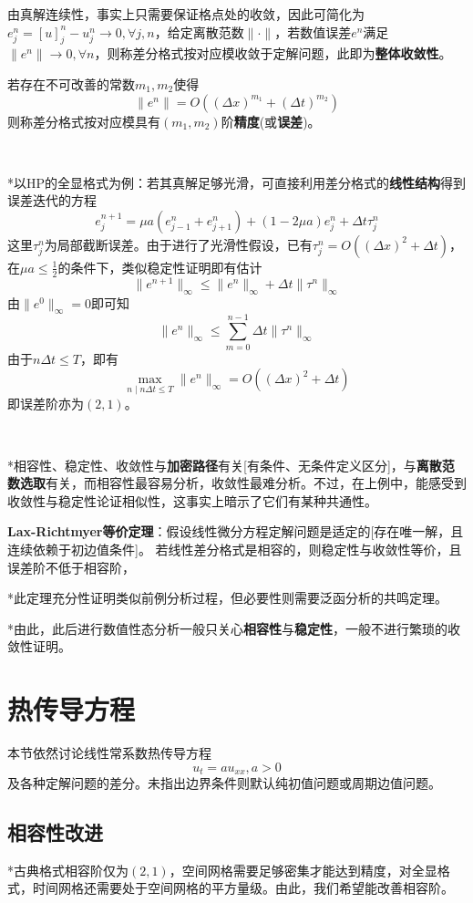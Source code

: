 \documentclass[a4paper,UTF8,fontset=windows]{ctexart}
\begin{document}
由真解连续性，事实上只需要保证格点处的收敛，因此可简化为$e_j^n=[u]_j^n-u_j^n\to0,\forall j,n$，给定离散范数$\|\cdot\|$，若数值误差$e^n$满足$\|e^n\|\to0,\forall n$，则称差分格式按对应模收敛于定解问题，此即为\textbf{整体收敛性}。

若存在不可改善的常数$m_1,m_2$使得
$$\|e^n\|=O((\Delta x)^{m_1}+(\Delta t)^{m_2})$$
则称差分格式按对应模具有$(m_1,m_2)$阶\textbf{精度}(或\textbf{误差})。

\

*以HP的全显格式为例：若其真解足够光滑，可直接利用差分格式的\textbf{线性结构}得到误差迭代的方程
$$e_j^{n+1}=\mu a(e_{j-1}^n+e_{j+1}^n)+(1-2\mu a)e_j^n+\Delta t\tau_j^n$$
这里$\tau_j^n$为局部截断误差。由于进行了光滑性假设，已有$\tau_j^n=O((\Delta x)^2+\Delta t)$，在$\mu a\le\frac{1}{2}$的条件下，类似稳定性证明即有估计
$$\|e^{n+1}\|_\infty\le\|e^n\|_\infty+\Delta t\|\tau^n\|_\infty$$
由$\|e^0\|_\infty=0$即可知
$$\|e^n\|_\infty\le\sum_{m=0}^{n-1}\Delta t\|\tau^n\|_\infty$$
由于$n\Delta t\le T$，即有
$$\max_{n\mid n\Delta t\le T}\|e^n\|_\infty=O((\Delta x)^2+\Delta t)$$
即误差阶亦为$(2,1)$。

\

*相容性、稳定性、收敛性与\textbf{加密路径}有关[有条件、无条件定义区分]，与\textbf{离散范数选取}有关，而相容性最容易分析，收敛性最难分析。不过，在上例中，能感受到收敛性与稳定性论证相似性，这事实上暗示了它们有某种共通性。

\textbf{Lax-Richtmyer等价定理}：假设线性微分方程定解问题是适定的[存在唯一解，且连续依赖于初边值条件]。
若线性差分格式是相容的，则稳定性与收敛性等价，且误差阶不低于相容阶，

*此定理充分性证明类似前例分析过程，但必要性则需要泛函分析的共鸣定理。

*由此，此后进行数值性态分析一般只关心\textbf{相容性}与\textbf{稳定性}，一般不进行繁琐的收敛性证明。

\section{热传导方程}
本节依然讨论线性常系数热传导方程
$$u_t=au_{xx},a>0$$
及各种定解问题的差分。未指出边界条件则默认纯初值问题或周期边值问题。

\subsection{相容性改进}
*古典格式相容阶仅为$(2,1)$，空间网格需要足够密集才能达到精度，对全显格式，时间网格还需要处于空间网格的平方量级。由此，我们希望能改善相容阶。
\end{document}
